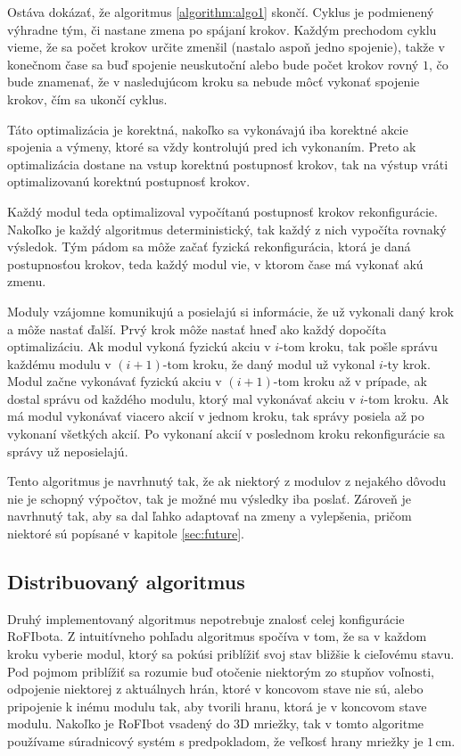 \documentclass[
  digital, %
  oneside, %
  notable,   %
  lof,     %
  nolot,     %
]{fithesis3}
\begin{document}
Ostáva dokázať, že algoritmus \ref{algorithm:algo1} skončí. Cyklus je podmienený výhradne tým, či nastane zmena po spájaní krokov. Každým prechodom cyklu vieme, že sa počet krokov určite zmenšil (nastalo aspoň jedno spojenie), takže v konečnom čase sa buď spojenie neuskutoční alebo bude počet krokov rovný $1$, čo bude znamenať, že v nasledujúcom kroku sa nebude môcť vykonať spojenie krokov, čím sa ukončí cyklus. 

Táto optimalizácia je korektná, nakoľko sa vykonávajú iba korektné akcie spojenia a výmeny, ktoré sa vždy kontrolujú pred ich vykonaním. Preto ak optimalizácia dostane na vstup korektnú postupnosť krokov, tak na výstup vráti optimalizovanú korektnú postupnosť krokov. 

Každý modul teda optimalizoval vypočítanú postupnosť krokov rekonfigurácie. Nakoľko je každý algoritmus deterministický, tak každý z nich vypočíta rovnaký výsledok. Tým pádom sa môže začať fyzická rekonfigurácia, ktorá je daná postupnosťou krokov, teda každý modul vie, v ktorom čase má vykonať akú zmenu. 

Moduly vzájomne komunikujú a posielajú si informácie, že už vykonali daný krok a môže nastať ďalší. Prvý krok môže nastať hneď ako každý dopočíta optimalizáciu. Ak modul vykoná fyzickú akciu v $i$-tom kroku, tak pošle správu každému modulu v $(i + 1)$-tom kroku, že daný modul už vykonal $i$-ty krok. Modul začne vykonávať fyzickú akciu v $(i + 1)$-tom kroku až v prípade, ak dostal správu od každého modulu, ktorý mal vykonávať akciu v $i$-tom kroku. Ak má modul vykonávať viacero akcií v jednom kroku, tak správy posiela až po vykonaní všetkých akcií. Po vykonaní akcií v poslednom kroku rekonfigurácie sa správy už neposielajú. 

Tento algoritmus je navrhnutý tak, že ak niektorý z modulov z nejakého dôvodu nie je schopný výpočtov, tak je možné mu výsledky iba poslať. Zároveň je navrhnutý tak, aby sa dal ľahko adaptovať na zmeny a vylepšenia, pričom niektoré sú popísané v kapitole \ref{sec:future}.  

\subsection{Distribuovaný algoritmus}
\label{sec:distributedAlgo}
Druhý implementovaný algoritmus nepotrebuje znalosť celej konfigurácie RoFIbota. Z intuitívneho pohľadu algoritmus spočíva v tom, že sa v každom kroku vyberie modul, ktorý sa pokúsi priblížiť svoj stav bližšie k cieľovému stavu. Pod pojmom priblížiť sa rozumie buď otočenie niektorým zo stupňov voľnosti, odpojenie niektorej z aktuálnych hrán, ktoré v koncovom stave nie sú, alebo pripojenie k inému modulu tak, aby tvorili hranu, ktorá je v koncovom stave modulu. Nakoľko je RoFIbot vsadený do 3D mriežky, tak v tomto algoritme používame súradnicový systém s predpokladom, že veľkosť hrany mriežky je $1$\,cm. 
\end{document}
